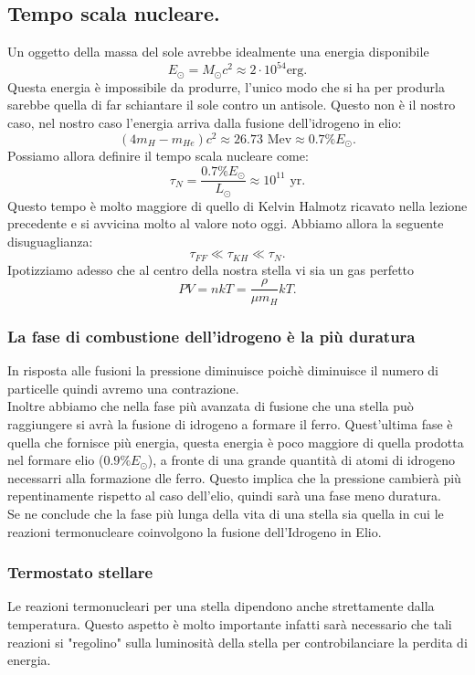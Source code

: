 \subsection{Tempo scala nucleare.}
\label{subsec:Tempo scala nucleare.}
Un oggetto della massa del sole avrebbe idealmente una energia disponibile
\[
	E_{\odot}=M_{\odot}c^2 \approx 2 \cdot 10^{54} \text{erg}
.\] 
Questa energia è impossibile da produrre, l'unico modo che si ha per produrla sarebbe quella di far schiantare il sole contro un antisole. Questo non è il nostro caso, nel nostro caso l'energia arriva dalla fusione dell'idrogeno in elio:
\[
	\left( 4m_{H}-m_{He} \right) c^2 \approx 26.73 \text{ Mev} \approx 0.7 \% E_{\odot}
.\] 
Possiamo allora definire il tempo scala nucleare come:
\[
	\tau_{N} = \frac{0.7\%E_{\odot}}{L_{\odot}} \approx 10^{11} \text{ yr}
.\] 
Questo tempo è molto maggiore di quello di Kelvin Halmotz ricavato nella lezione precedente e si avvicina molto al valore noto oggi. Abbiamo allora la seguente disuguaglianza:
\[
	\tau_{FF} \ll \tau  _{KH} \ll \tau_{N}
.\] 
Ipotizziamo adesso che al centro della nostra stella vi sia un gas perfetto
\[
	PV=nkT = \frac{\rho }{\mu m_H}kT
.\] 
\subsubsection{La fase di combustione dell'idrogeno è la più duratura}
\label{subsubsec:La fase di combustione dell'idrogeno è la più duratura}
In risposta alle fusioni la pressione diminuisce poichè diminuisce il numero di particelle quindi avremo una contrazione.\\
Inoltre abbiamo che nella fase più avanzata di fusione che una stella può raggiungere si avrà la fusione di idrogeno a formare il ferro. Quest'ultima fase è quella che fornisce più energia, questa energia è poco maggiore di quella prodotta nel formare elio ($0.9\% E_{\odot}$), a fronte di una grande quantità di atomi di idrogeno necessarri alla formazione dle ferro. Questo implica che la pressione cambierà più repentinamente rispetto al caso dell'elio, quindi sarà una fase meno duratura.\\
Se ne conclude che la fase più lunga della vita di una stella sia quella in cui le reazioni termonucleare coinvolgono la fusione dell'Idrogeno in Elio.
\subsubsection{Termostato stellare}
\label{subsubsec:Termostato stellare}
Le reazioni termonucleari per una stella dipendono anche strettamente dalla temperatura.
Questo aspetto è molto importante infatti sarà necessario che tali reazioni si "regolino" sulla luminosità della stella per controbilanciare la perdita di energia.
